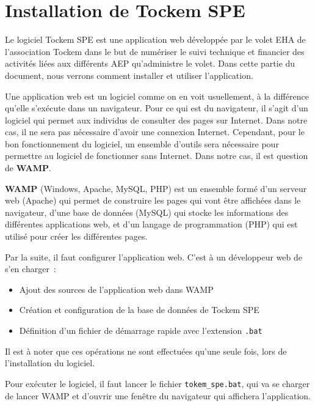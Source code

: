 \chapter{Installation de Tockem SPE}

Le logiciel Tockem SPE est une application web développée par le volet EHA de l'association Tockem dans le but de numériser le suivi technique et financier des activités liées aux différents AEP qu'administre le volet. Dans cette partie du document, nous verrons comment installer et utiliser l'application.

Une application web est un logiciel comme on en voit usuellement, à la différence qu'elle s'exécute dans un navigateur. Pour ce qui est du navigateur, il s'agit d'un logiciel qui permet aux individus de consulter des pages sur Internet. Dans notre cas, il ne sera pas nécessaire d'avoir une connexion Internet. Cependant, pour le bon fonctionnement du logiciel, un ensemble d'outils sera nécessaire pour permettre au logiciel de fonctionner sans Internet. Dans notre cas, il est question de \textbf{WAMP}.

\textbf{WAMP} (Windows, Apache, MySQL, PHP) est un ensemble formé d'un serveur web (Apache) qui permet de construire les pages qui vont être affichées dans le navigateur, d'une base de données (MySQL) qui stocke les informations des différentes applications web, et d'un langage de programmation (PHP) qui est utilisé pour créer les différentes pages.

Par la suite, il faut configurer l'application web. C'est à un développeur web de s'en charger~:
\begin{itemize}
    \item Ajout des sources de l'application web dans WAMP
    \item Création et configuration de la base de données de Tockem SPE
    \item Définition d'un fichier de démarrage rapide avec l'extension \texttt{.bat}
\end{itemize}

Il est à noter que ces opérations ne sont effectuées qu'une seule fois, lors de l'installation du logiciel.

Pour exécuter le logiciel, il faut lancer le fichier \texttt{tokem\_spe.bat}, qui va se charger de lancer WAMP et d'ouvrir une fenêtre du navigateur qui affichera l'application.
